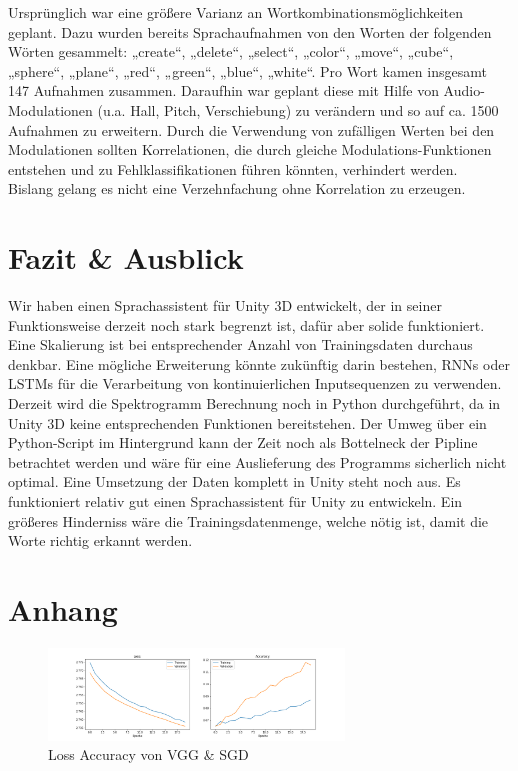 \documentclass[sigconf]{acmart}
\begin{document}
\noindent Ursprünglich war eine größere Varianz an Wortkombinationsmöglichkeiten geplant. Dazu wurden bereits Sprachaufnahmen von den Worten der folgenden Wörten gesammelt: 
\newline
\newline
„create“, „delete“, „select“, „color“, „move“, „cube“, „sphere“, „plane“, „red“, „green“, „blue“, „white“. 
\newline
\newline
Pro Wort kamen insgesamt 147 Aufnahmen zusammen. Daraufhin war geplant diese mit Hilfe von Audio-Modulationen (u.a. Hall, Pitch, Verschiebung) zu verändern und so auf ca. 1500 Aufnahmen zu erweitern. Durch die Verwendung von zufälligen Werten bei den Modulationen sollten Korrelationen, die durch gleiche Modulations-Funktionen entstehen und zu Fehlklassifikationen führen könnten, verhindert werden.\\
Bislang gelang es nicht eine Verzehnfachung ohne Korrelation zu erzeugen.

\section{Fazit \& Ausblick}
Wir haben einen Sprachassistent für Unity 3D entwickelt, der in seiner Funktionsweise derzeit noch stark begrenzt ist, dafür aber solide funktioniert. Eine Skalierung ist bei entsprechender Anzahl von Trainingsdaten durchaus denkbar. Eine mögliche Erweiterung könnte zukünftig darin bestehen, RNNs oder LSTMs für die Verarbeitung von kontinuierlichen Inputsequenzen zu verwenden.
\newline
\newline
Derzeit wird die Spektrogramm Berechnung noch in Python durchgeführt, da in Unity 3D keine entsprechenden Funktionen bereitstehen. Der Umweg über ein Python-Script im Hintergrund kann der Zeit noch als Bottelneck der Pipline betrachtet werden und wäre für eine Auslieferung des Programms sicherlich nicht optimal. Eine Umsetzung der Daten komplett in Unity steht noch aus. 
\newline
\newline
Es funktioniert relativ gut einen Sprachassistent für Unity zu entwickeln. Ein größeres Hinderniss wäre die Trainingsdatenmenge, welche nötig ist, damit die Worte richtig erkannt werden. 




\newpage
\onecolumn
\appendix
\section{Anhang}
\label{section:Anhang}
\begin{figure}[H]
  \includegraphics[width=0.7\textwidth]{images/Loss_Acc_VGG_SGD}
  \caption{Loss Accuracy von VGG \& SGD}
  \Description{}
  \label{fig:VGG_SGD}
\end{figure} 
\end{document}
